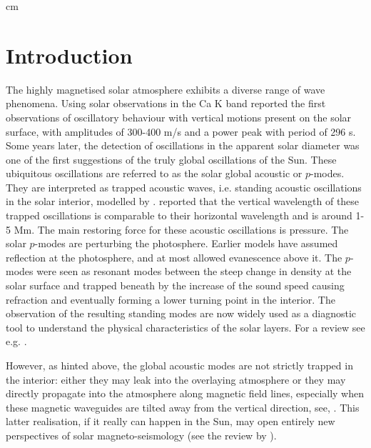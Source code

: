 \documentclass[preprint,authoryear,12pt]{elsarticle}
\begin{document}
 cm

\section{Introduction}
The highly magnetised solar atmosphere exhibits a diverse range of wave phenomena. Using solar observations in the Ca K band \citet{Leighton1960} reported the first observations of oscillatory behaviour with vertical motions present on the solar surface, with amplitudes of 300-400 m/s and a power peak with period of 296 s. Some years later, the detection of oscillations in the apparent solar diameter \citep[see e.g][]{Hill1976, Brown1978} was one of the first suggestions of the truly global oscillations of the Sun. These ubiquitous oscillations are referred to as the solar global acoustic or $p$-modes.  They are interpreted as trapped acoustic waves, i.e. standing acoustic oscillations in the solar interior, modelled by \citet{Ulrich1970}. \citet{Leibacher1971} reported that the vertical wavelength of these trapped oscillations is comparable to their horizontal wavelength and is around 1-5 Mm. The main restoring force for these acoustic oscillations is pressure. The solar $p$-modes are perturbing the photosphere. Earlier models have assumed reflection at the photosphere, and at most allowed evanescence above it. The $p$-modes were seen as resonant modes between the steep change in density at the solar surface and trapped beneath by the increase of the sound speed causing refraction and eventually forming a lower turning point in the interior. The observation of the resulting standing modes are now widely used as a diagnostic tool to understand the physical characteristics of the  solar layers. For a review see e.g. \citet{Christensen-Dalsgaard2002,Erdelyi2006A, Erdelyi2006B,Thompson2006,Pinter2011}.   

However, as hinted above, the global acoustic modes are not strictly trapped in the interior: either they may leak into the overlaying atmosphere or they may directly propagate into the atmosphere along magnetic field lines, especially when these magnetic waveguides are tilted away from the vertical direction, see, \citet{DePontieu2003A, DePontieu2003B,DePontieu2005}. This latter realisation, if it really can happen in the Sun, may open entirely new perspectives of solar magneto-seismology (see the review by \citet{DePontieu2006}).  
\end{document}
